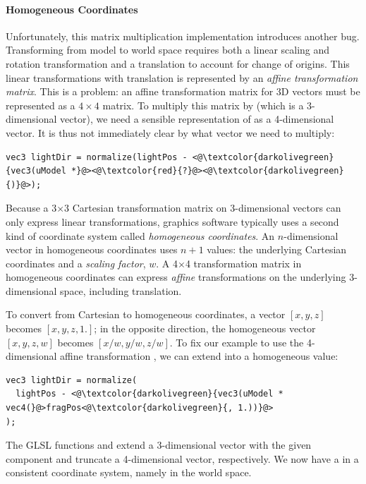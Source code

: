 \paragraph{Homogeneous Coordinates}
Unfortunately, this matrix multiplication implementation introduces another bug.
Transforming  from model to world space requires both a linear scaling and rotation transformation and a translation to account for change of origins.
This linear transformations with translation is represented by an \emph{affine transformation matrix}. 
This is a problem: an affine transformation matrix for 3D vectors must be represented as a $4\times4$ matrix. To multiply this matrix by  (which is a 3-dimensional vector), we need a sensible representation of  as a 4-dimensional vector.
It is thus not immediately clear by what vector we need to multiply:
%
\begin{lstlisting}
vec3 lightDir = normalize(lightPos - <@\textcolor{darkolivegreen}{vec3(uModel *}@><@\textcolor{red}{?}@><@\textcolor{darkolivegreen}{)}@>);
\end{lstlisting}
%
Because a 3$\times$3 Cartesian transformation matrix on 3-dimensional vectors can only express linear transformations, graphics software typically uses a second kind of coordinate system called \emph{homogeneous coordinates}.
An $n$-dimensional vector in homogeneous coordinates uses $n+1$ values: the underlying Cartesian coordinates and a \emph{scaling factor}, $w$.
A 4$\times$4 transformation matrix in homogeneous coordinates can express \emph{affine} transformations on the underlying 3-dimensional space, including translation.

To convert from Cartesian to homogeneous coordinates, a vector $[x, y, z]$ becomes $[x, y, z, 1.]$;
in the opposite direction, the homogeneous vector $[x, y, z, w]$ becomes $[x/w, y/w, z/w]$.
To fix our example to use the 4-dimensional affine transformation , we can extend  into a homogeneous  value:
%
\begin{lstlisting}
vec3 lightDir = normalize(
  lightPos - <@\textcolor{darkolivegreen}{vec3(uModel * vec4(}@>fragPos<@\textcolor{darkolivegreen}{, 1.))}@>
);
\end{lstlisting}
%
The GLSL functions  and  extend a 3-dimensional vector with the given component and truncate a 4-dimensional vector, respectively. We now have a  in a consistent coordinate system, namely in the world space.

